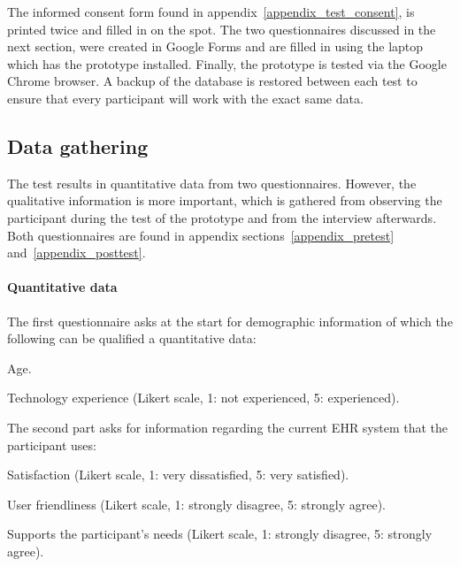     \noindent The informed consent form found in appendix~\ref{appendix_test_consent}, is printed twice and filled in on the spot. The two questionnaires discussed in the next section, were created in Google Forms and are filled in using the laptop which has the prototype installed. Finally, the prototype is tested via the Google Chrome browser. A backup of the database is restored between each test to ensure that every participant will work with the exact same data.

    \subsection{Data gathering}

    The test results in quantitative data from two questionnaires. However, the qualitative information is more important, which is gathered from observing the participant during the test of the prototype and from the interview afterwards. Both questionnaires are found in appendix sections~\ref{appendix_pretest} and~\ref{appendix_posttest}.

    \paragraph{Quantitative data} The first questionnaire asks at the start for demographic information of which the following can be qualified a quantitative data: 
    \vspace{-6pt}
    \begin{myitemize}
        \item Age.
        \item Technology experience (Likert scale, 1: not experienced, 5: experienced).
    \end{myitemize}
    \noindent The second part asks for information regarding the current EHR system that the participant uses: 
    \vspace{-6pt}
    \begin{myitemize}
        \item Satisfaction (Likert scale, 1: very dissatisfied, 5: very satisfied).
        \item User friendliness (Likert scale, 1: strongly disagree, 5: strongly agree).
        \item Supports the participant's needs (Likert scale, 1: strongly disagree, 5: strongly agree).
    \end{myitemize}


